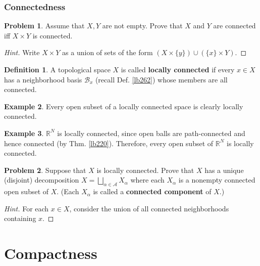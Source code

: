 \documentclass[12pt,b5paper,notitlepage]{article}
\theoremstyle{definition}
\newtheorem{df}{Definition}[section]
\newtheorem{eg}[df]{Example}
\newtheorem{prob}{\color{red}Problem}[section]
\theoremstyle{plain}
\newcommand{\mc}{\mathcal}
\newcommand{\scr}{\mathscr}
\newcommand{\Rbb}{\mathbb R}
\numberwithin{equation}{section}
\begin{document}
\subsubsection{Connectedness}

\begin{prob}
Assume that $X,Y$ are not empty. Prove that $X$ and $Y$ are connected iff $X\times Y$ is connected.
\end{prob}

\begin{proof}[Hint]
Write $X\times Y$ as a union of sets of the form $(X\times\{y\})\cup (\{x\}\times Y)$.
\end{proof}


\begin{df}
A topological space $X$ is called \textbf{locally connected}  if every $x\in X$ has a neighborhood basis $\mc B_x$ (recall Def. \ref{lb262}) whose members are all connected.
\end{df}

\begin{eg}
Every open subset of a locally connected space is clearly locally connected.
\end{eg}

\begin{eg}
$\Rbb^N$ is locally connected, since open balls are path-connected and hence connected (by Thm. \ref{lb220}). Therefore, every open subset of $\Rbb^N$ is locally connected.
\end{eg}


\begin{prob}\label{lb221}
Suppose that $X$ is locally connected. Prove that $X$ has a unique (disjoint) decomposition $X=\bigsqcup_{\alpha\in\scr A}X_\alpha$ where each $X_\alpha$ is a nonempty connected open subset of $X$. (Each $X_\alpha$ is called a \textbf{connected component} of $X$.) 
\end{prob}

\begin{proof}[Hint]
For each $x\in X$, consider the union of all connected neighborhoods containing $x$.
\end{proof}




\newpage

\section{Compactness}\label{lb351}
\end{document}

